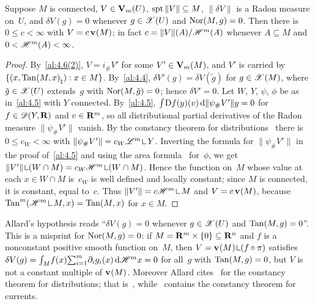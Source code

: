 \begin{theorem}
    \label{al:4.6(3)}
    Suppose $M$ is connected, $V \in \mathbf{V}_{m}(U)$, $\operatorname{spt} \|V\| \subseteq M$, $\|\delta V\|$ is
    a Radon measure on~$U$, and $\delta V(g) = 0$ whenever $g \in \mathscr{X}(U)$ and $\operatorname{Nor}(M,g) = 0$. Then
    there is $0 \le c < \infty$ with $V = c \, \mathbf{v}_{}(M)$; in fact $c = \|V\|(A) / \mathscr{H}^m(A)$
    whenever $A \subseteq M$ and $0 < \mathscr{H}^m(A) < \infty$.
\end{theorem}

\begin{proof}
    By~\ref{al:4.6(2)}, $V = i_\# V'$ for some $V' \in \mathbf{V}_{m}(M)$, and $V'$ is carried by $\{
    (x, {\operatorname{Tan}(M,x)}_\natural) : x \in M \}$. By~\ref{al:4.4}, $\delta V'(g) = \delta V(\tilde g)$
    for $g \in \mathscr{X}(M)$, where $\tilde g \in \mathscr{X}(U)$ extends~$g$ with $\operatorname{Nor}(M,\tilde g) = 0$;
    hence $\delta V' = 0$. Let $W$, $Y$, $\psi$, $\phi$ be as in~\ref{al:4.5} with $Y$ connected.
    By~\ref{al:4.5}, ${\textstyle\int_{}^{}} \mathrm{D} f(y)(v) \,\mathrm{d} \|\psi_\# V'\| y = 0$ for $f \in
    \mathscr{D}(Y,\mathbf{R})$ and $v \in \mathbf{R}^m$, so all distributional partial derivatives of the Radon
    measure $\|\psi_\# V'\|$ vanish. By the constancy theorem for
    distributions~\cite[4.1.4]{Federer1969} there is $0 \le c_W < \infty$ with $\|\psi_\# V'\| =
    c_W \LM^m \restrict Y$. Inverting the formula for $\|\psi_\# V'\|$ in the proof
    of~\ref{al:4.5} and using the area formula~\cite[3.2.3, 3.2.5]{Federer1969} for~$\phi$, we
    get $\|V'\| \restrict (W \cap M) = c_W \HM^m \restrict (W \cap M)$. Hence the function on~$M$ whose value at each
    $x \in W \cap M$ is~$c_W$ is well defined and locally constant; since $M$ is connected,
    it is constant, equal to~$c$. Thus $\|V'\| = c \HM^m \restrict M$ and $V = c \, \mathbf{v}_{}(M)$,
    because $\Tan^m(\HM^m \restrict M, x) = \Tan(M,x)$ for $x \in M$.
\end{proof}

\begin{remark}
    \label{rem:4.6(3)}
    Allard's hypothesis reads ``$\delta V(g) = 0$ whenever $g \in \mathscr{X}(U)$ and $\operatorname{Tan}(M,g) = 0$''.
    This is a misprint for $\operatorname{Nor}(M,g) = 0$: if $M = \mathbf{R}^m \times \{0\} \subseteq \mathbf{R}^{n}$ and $f$
    is a nonconstant positive smooth function on~$M$, then $V = \var{}(M) \restrict (f \circ
    \pi)$ satisfies $\delta V(g) = {\textstyle\int_{M}^{}} f(x) {\textstyle\sum_{i=1}^{m}} \partial_i g_i(x) \,\mathrm{d} \mathscr{H}^m
    x = 0$ for all~$g$ with $\operatorname{Tan}(M,g) = 0$, but $V$ is not a constant multiple of $\mathbf{v}_{}(M)$.
    Moreover Allard cites~\cite[4.1.7]{Federer1969} for the constancy theorem for distributions;
    that is~\cite[4.1.4]{Federer1969}, while~\cite[4.1.7]{Federer1969} contains the constancy theorem
    for currents.
\end{remark}


